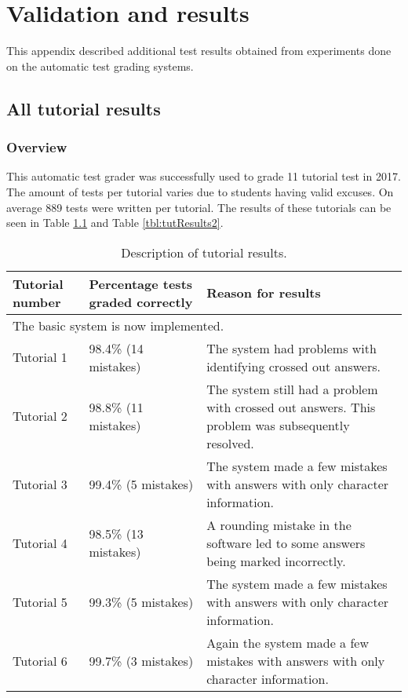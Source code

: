 \chapter{Validation and results}
\label{ap:results}
\graphicspath{{Appendix5/Appendix5figures/}}

This appendix described additional test results obtained from experiments done on the automatic test grading systems.

\section{All tutorial results}
\label{sec:tutorialResults}

\subsection{Overview}

This automatic test grader was successfully used to grade 11 tutorial test in 2017. The amount of tests per tutorial varies due to students having valid excuses. On average 889 tests were written per tutorial. The results of these tutorials can be seen in Table \ref{tbl:tutResults} and Table \ref{tbl:tutResults2}.

\begin{table}
\caption{Description of tutorial results.} \label{tbl:tutResults}
  \centering
\begin{tabular}{|p{2cm}|p{4cm}|p{5cm}|}
\hline
\textbf{Tutorial number}&\textbf{Percentage tests graded correctly}&\textbf{Reason for results}\\
\hline
\multicolumn{3}{|l|}{The basic system is now implemented.}\\
\hline
Tutorial 1&98.4\% (14 mistakes)&The system had problems with identifying crossed out answers.\\
\hline
Tutorial 2&98.8\% (11 mistakes)&The system still had a problem with crossed out answers.  This problem was subsequently resolved.\\
\hline
Tutorial 3&99.4\% (5 mistakes)&The system made a few mistakes with answers with only character information.\\
\hline
Tutorial 4&98.5\% (13 mistakes)&A rounding mistake in the software led to some answers being marked incorrectly.\\
\hline
Tutorial 5&99.3\% (5 mistakes)&The system made a few mistakes with answers with only character information.\\
\hline
Tutorial 6&99.7\% (3 mistakes)&Again the system made a few mistakes with answers with only character information.\\
\hline
\end{tabular} 
\end{table}

